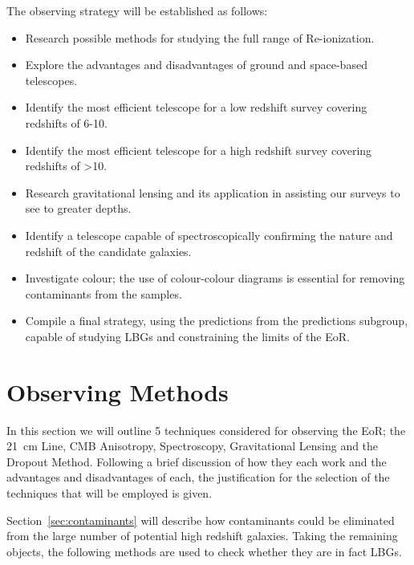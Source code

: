 	The observing strategy will be established as follows:
	\begin{itemize}
		\item Research possible methods for studying the full range of Re-ionization.
		\item Explore the advantages and disadvantages of ground and space-based telescopes.
		\item Identify the most efficient telescope for a low redshift survey covering redshifts of 6-10.
		\item Identify the most efficient telescope for a high redshift survey covering redshifts of >10.
		\item Research gravitational lensing and its application in assisting our surveys to see to greater depths.
		\item Identify a telescope capable of spectroscopically confirming the nature and redshift of the candidate galaxies.
		\item Investigate colour; the use of colour-colour diagrams is essential for removing contaminants from the samples.
		\item Compile a final strategy, using the predictions from the predictions subgroup, capable of studying LBGs and constraining the limits of the EoR.
	\end{itemize}

\section{Observing Methods} %
\label{sec:observing_methods}
	In this section we will outline 5 techniques considered for observing the EoR; the \SI{21}{\centi\metre} Line, CMB Anisotropy, Spectroscopy, Gravitational Lensing and the Dropout Method. Following a brief discussion of how they each work and the advantages and disadvantages of each, the justification for the selection of the techniques that will be employed is given.

	Section~\ref{sec:contaminants} will describe how contaminants could be eliminated from the large number of potential high redshift galaxies. Taking the remaining objects, the following methods are used to check whether they are in fact LBGs.

